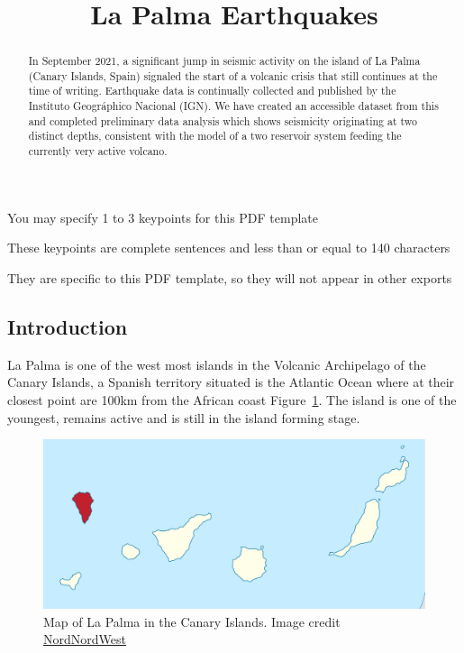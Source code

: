 \documentclass[
]{agujournal2019}
\begin{document}
\title{La Palma Earthquakes}


\begin{keypoints}
\item You may specify 1 to 3 keypoints for this PDF template \item These
keypoints are complete sentences and less than or equal to 140
characters \item They are specific to this PDF template, so they will
not appear in other exports 
\end{keypoints}

\begin{abstract}
In September 2021, a significant jump in seismic activity on the island
of La Palma (Canary Islands, Spain) signaled the start of a volcanic
crisis that still continues at the time of writing. Earthquake data is
continually collected and published by the Instituto Geográphico
Nacional (IGN). We have created an accessible dataset from this and
completed preliminary data analysis which shows seismicity originating
at two distinct depths, consistent with the model of a two reservoir
system feeding the currently very active volcano.
\end{abstract}



\subsection{Introduction}\label{introduction}

La Palma is one of the west most islands in the Volcanic Archipelago of
the Canary Islands, a Spanish territory situated is the Atlantic Ocean
where at their closest point are 100km from the African coast
Figure~\ref{fig-map}. The island is one of the youngest, remains active
and is still in the island forming stage.

\begin{figure}

{\centering \includegraphics[width=1\textwidth,height=\textheight]{images/la-palma-map.png}

}

\caption{\label{fig-map}Map of La Palma in the Canary Islands. Image
credit
\href{https://commons.wikimedia.org/w/index.php?curid=76638603}{NordNordWest}}

\end{figure}
\end{document}

